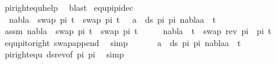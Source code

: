 \begin{isabellebody}
\ pi{\isacharunderscore}{\kern0pt}right{\isacharunderscore}{\kern0pt}equ{\isacharunderscore}{\kern0pt}help\ \isamarkupfalse%
\ blast%
\endisatagproof
{\isafoldproof}%
%
\isadelimproof
\isanewline
%
\endisadelimproof
\isanewline
\isanewline
{}\isamarkupfalse%
\ equ{\isacharunderscore}{\kern0pt}pi{}{\isacharunderscore}{\kern0pt}pi{}{\isacharunderscore}{\kern0pt}dec{\isacharcolon}{\kern0pt}\ \ \isanewline
\ \ {\isachardoublequoteopen}{\isacharparenleft}{\kern0pt}nabla\ {\isasymturnstile}\ swap\ pi{}\ t\ {\isasymapprox}\ swap\ pi{}\ t{\isacharparenright}{\kern0pt}\ {\isasymLongrightarrow}\ {\isacharparenleft}{\kern0pt}{\isasymforall}\ a\ {\isasymin}\ ds\ pi{}\ pi{}{\isachardot}{\kern0pt}\ nabla{\isasymturnstile}a\ {\isasymsharp}\ t{\isacharparenright}{\kern0pt}{\isachardoublequoteclose}\isanewline
%
\isadelimproof
%
\endisadelimproof
%
\isatagproof
{}\isamarkupfalse%
{\isacharminus}{\kern0pt}\isanewline
\ \ \isamarkupfalse%
\ assm{\isacharcolon}{\kern0pt}\ {\isachardoublequoteopen}nabla\ {\isasymturnstile}\ swap\ pi{}\ t\ {\isasymapprox}\ swap\ pi{}\ t{\isachardoublequoteclose}\isanewline
\ \ \isamarkupfalse%
\ \isamarkupfalse%
\ {\isachardoublequoteopen}nabla\ {\isasymturnstile}\ t\ {\isasymapprox}\ swap\ {\isacharparenleft}{\kern0pt}{\isacharparenleft}{\kern0pt}rev\ pi{}{\isacharparenright}{\kern0pt}\ {\isacharat}{\kern0pt}\ pi{}{\isacharparenright}{\kern0pt}\ t{\isachardoublequoteclose}\isanewline
\ \ \ \ \isamarkupfalse%
\ equ{\isacharunderscore}{\kern0pt}pi{\isacharunderscore}{\kern0pt}to{\isacharunderscore}{\kern0pt}right\ swap{\isacharunderscore}{\kern0pt}append\ \isamarkupfalse%
\ simp\isanewline
\ \ \isamarkupfalse%
\ \isamarkupfalse%
\ {\isachardoublequoteopen}{\isasymforall}\ a\ {\isasymin}\ ds\ pi{}\ pi{}{\isachardot}{\kern0pt}\ nabla{\isasymturnstile}a\ {\isasymsharp}\ t{\isachardoublequoteclose}\isanewline
\ \ \ \ \isamarkupfalse%
\ pi{\isacharunderscore}{\kern0pt}right{\isacharunderscore}{\kern0pt}equ\ ds{\isacharunderscore}{\kern0pt}rev{\isacharbrackleft}{\kern0pt}of\ pi{}\ pi{}{\isacharbrackright}{\kern0pt}\ \isamarkupfalse%
\ simp\isanewline
{}\isamarkupfalse%
%
\endisatagproof
{\isafoldproof}%
%
\isadelimproof
\isanewline
%
\endisadelimproof
\isanewline
{}\isamarkupfalse%

\end{isabellebody}
